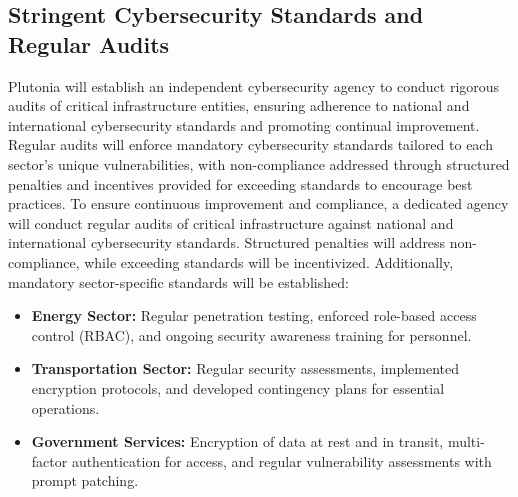 \documentclass[
	a4paper, %
	10pt, %
]{CSSullivanBusinessReport}
\begin{document}
\begin{fullwidth}
\begin{justify}
\subsection{Stringent Cybersecurity Standards and Regular Audits}
Plutonia will establish an independent cybersecurity agency to conduct rigorous audits of critical infrastructure entities, ensuring adherence to national and international cybersecurity standards and promoting continual improvement. Regular audits will enforce mandatory cybersecurity standards tailored to each sector’s unique vulnerabilities, with non-compliance addressed through structured penalties and incentives provided for exceeding standards to encourage best practices. To ensure continuous improvement and compliance, a dedicated agency will conduct regular audits of critical infrastructure against national and international cybersecurity standards. Structured penalties will address non-compliance, while exceeding standards will be incentivized. Additionally, mandatory sector-specific standards will be established:
\begin{itemize}
	\item \textbf{Energy Sector:} Regular penetration testing, enforced role-based access control (RBAC), and ongoing security awareness training for personnel.
	\item \textbf{Transportation Sector:} Regular security assessments, implemented encryption protocols, and developed contingency plans for essential operations.
	\item \textbf{Government Services:} Encryption of data at rest and in transit, multi-factor authentication for access, and regular vulnerability assessments with prompt patching.
\end{itemize}

\end{justify}
\end{fullwidth}
\end{document}
